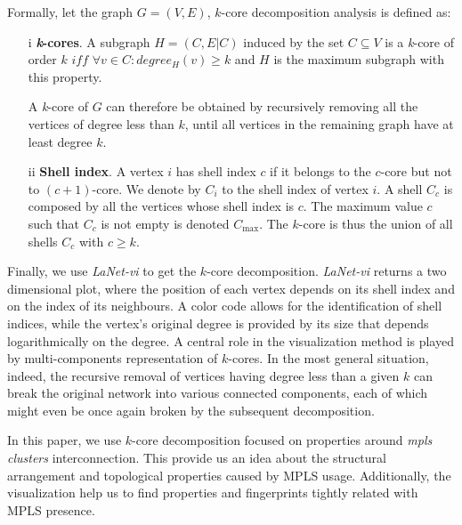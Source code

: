Formally, let the graph $G=(V,E)$, $k$-core decomposition analysis is defined as:

\begin{itemize}
\item[i]{\textbf{\textit{k}-cores}}. A subgraph $H=(C,E|C)$ induced by the set $ C\subseteq V$ is a \textit{k}-core of order $k$ $iff$ $\forall v \in C: degree_{H}(v)\geq k$ and $H$ is the maximum subgraph with this property.

A \textit{k}-core of $G$ can therefore be obtained by recursively removing all the vertices of degree less than $k$, until all vertices in the remaining graph have at least degree $k$. 

\item[ii]\textbf{Shell index}. A vertex $i$ has shell index $c$ if it belongs to the $c$-core but not to $(c+1)$-core. We denote by $C_i$ to the shell index of vertex $i$. A shell $C_c$ is composed by all the vertices whose shell index is $c$. The maximum value $c$ such that $C_c$ is not empty is denoted $C_{\max}$. The $k$-core is thus the union of all shells $C_c$ with $c \geq k$.

\end{itemize}

Finally, we use  \textit{LaNet-vi} \cite{Alvarez06k} to get the $k$-core decomposition. \textit{LaNet-vi} returns a two dimensional plot, where the position of each vertex depends on its shell index and on the index of its neighbours. A color code allows for the identification of shell indices, while the vertex's original degree is provided by its size that depends logarithmically on the degree. A central role in the visualization method is played by multi-components representation of $k$-cores. In the most general situation, indeed, the recursive removal of vertices having degree less than a given $k$ can break the original network into various connected components, each of which might even be once again broken by the subsequent decomposition.

In this paper, we use $k$-core decomposition focused on properties around \textit{mpls clusters} interconnection. This provide us an idea about the structural arrangement and topological properties caused by MPLS usage. Additionally,  the visualization help us to find properties and fingerprints tightly related with MPLS presence.


